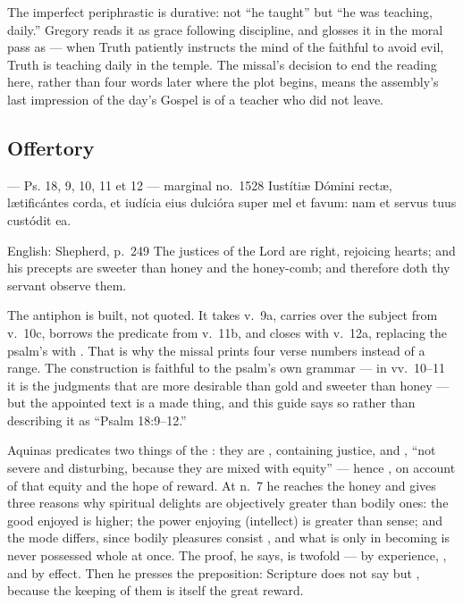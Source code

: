 The imperfect periphrastic is
durative: not ``he taught'' but ``he was teaching, daily.'' Gregory reads it
as grace following discipline, and glosses it in the moral pass as
 --- when Truth patiently instructs
the mind of the faithful to avoid evil, Truth is teaching daily in the temple.
The missal's decision to end the reading here, rather than four words later
where the plot begins, means the assembly's last impression of the day's
Gospel is of a teacher who did not leave.

\subsection*{Offertory }

\begin{appointedlatin}{ --- Ps. 18, 9, 10, 11 et 12 --- marginal no.\ 1528}
Iustítiæ Dómini rectæ, lætificántes corda, et iudícia eius dulcióra super mel
et favum: nam et servus tuus custódit ea.
\end{appointedlatin}

\begin{namedtranslation}{English: Shepherd, p.~249}
The justices of the Lord are right, rejoicing hearts; and his precepts are
sweeter than honey and the honey-comb; and therefore doth thy servant observe
them.
\end{namedtranslation}

The antiphon is built, not quoted. It takes v.~9a, carries over the subject
 from v.~10c, borrows the predicate  from v.~11b, and closes with v.~12a, replacing the psalm's
 with . That is why the missal prints four verse
numbers instead of a range. The construction is faithful to the psalm's own
grammar --- in vv.~10--11 it is the judgments that are more desirable than
gold and sweeter than honey --- but the appointed text is a made thing, and
this guide says so rather than describing it as ``Psalm 18:9--12.''

\begin{witnessnote}
Aquinas predicates two things of the : they are ,
containing justice, and , ``not severe and disturbing, because
they are mixed with equity'' --- hence , on account
of that equity and the hope of reward. At n.~7 he reaches the honey and gives
three reasons why spiritual delights are objectively greater than bodily ones:
the good enjoyed is higher; the power enjoying (intellect) is greater than
sense; and the mode differs, since bodily pleasures consist , and what is only in becoming is never possessed whole at once. The
proof, he says, is twofold --- by experience, , and by effect. Then he presses the preposition: Scripture does
not say  but , because the
keeping of them is itself the great reward.
\end{witnessnote}

